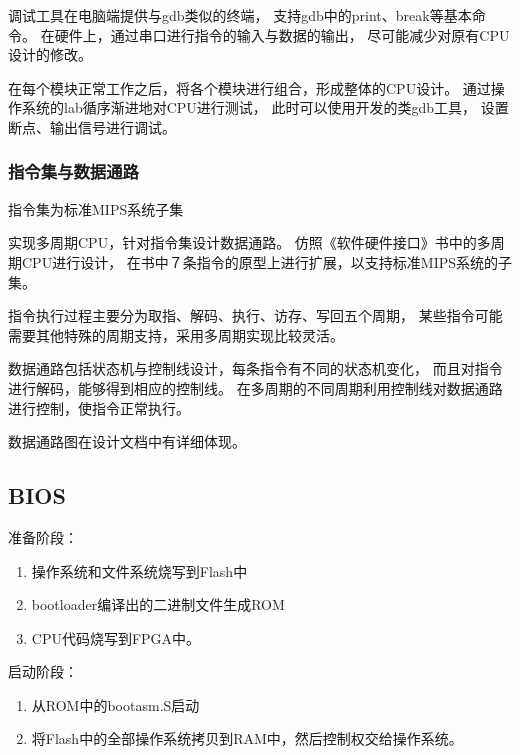             调试工具在电脑端提供与gdb类似的终端，%
            支持gdb中的print、break等基本命令。%
            在硬件上，通过串口进行指令的输入与数据的输出，%
            尽可能减少对原有CPU设计的修改。
            
            在每个模块正常工作之后，将各个模块进行组合，形成整体的CPU设计。%
            通过操作系统的lab循序渐进地对CPU进行测试，%
            此时可以使用开发的类gdb工具，%
            设置断点、输出信号进行调试。
            
        \subsubsection{指令集与数据通路}
            指令集为标准MIPS系统子集

            实现多周期CPU，针对指令集设计数据通路。
            仿照《软件硬件接口》书中的多周期CPU进行设计，
            在书中７条指令的原型上进行扩展，以支持标准MIPS系统的子集。
            
            指令执行过程主要分为取指、解码、执行、访存、写回五个周期，
            某些指令可能需要其他特殊的周期支持，采用多周期实现比较灵活。

            数据通路包括状态机与控制线设计，每条指令有不同的状态机变化，
            而且对指令进行解码，能够得到相应的控制线。%
            在多周期的不同周期利用控制线对数据通路进行控制，使指令正常执行。
            
            数据通路图在设计文档中有详细体现。

            
    \subsection{BIOS}
        准备阶段：
        \begin{enumerate}
            \item
                操作系统和文件系统烧写到Flash中%
            \item
                bootloader编译出的二进制文件生成ROM
            \item
                CPU代码烧写到FPGA中。
        \end{enumerate}

        启动阶段：
        \begin{enumerate}
            \item
                从ROM中的bootasm.S启动
            \item
                将Flash中的全部操作系统拷贝到RAM中，然后控制权交给操作系统。
        \end{enumerate}

